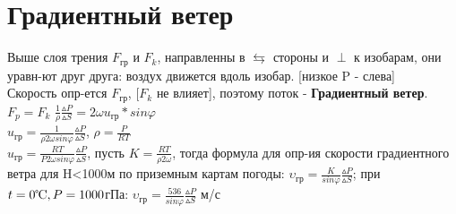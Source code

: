 
\section{Градиентный ветер}
Выше слоя трения $F_{\text{гр}}$ и $F_k$, направленны в $\leftrightarrows$ стороны и $\perp$ к изобарам, они уравн-ют друг друга: воздух движется вдоль изобар. [низкое P - слева]\\
Скорость опр-ется $F_{\text{гр}}$, [$F_k$ не влияет], поэтому поток - \textbf{Градиентный ветер}.\\
$F_p=F_k$ \hspace{5ex} $ \frac{1}{\rho}\frac{\vartriangle P}{\vartriangle S}=2\omega u_{\text{гр}}*sin\varphi $\\
$ u_{\text{гр}}=\frac{1}{\rho 2\omega sin\varphi}\frac{\vartriangle P}{\vartriangle S} $, $\rho=\frac{P}{RT}$\\
$ u_{\text{гр}}=\frac{RT}{P 2\omega sin\varphi}\frac{\vartriangle P}{\vartriangle S} $,
пусть $K=\frac{RT}{\rho 2\omega}$, тогда формула для опр-ия скорости градиентного ветра для H<1000м по приземным картам погоды:
$ \upsilon_{\text{гр}}=\frac{K}{sin\varphi}\frac{\vartriangle P}{\vartriangle S} $;
при $t=0\celsius, P=1000$гПа: $ \upsilon_{\text{гр}}=\frac{536}{sin\varphi}\frac{\vartriangle P}{\vartriangle S} $ м/с